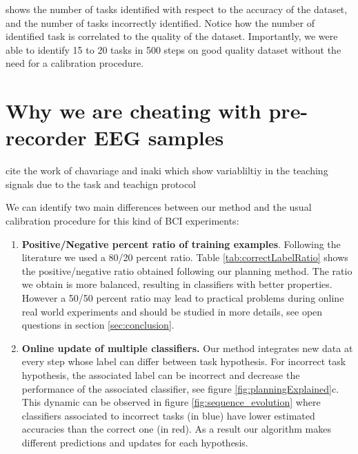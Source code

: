 shows the number of tasks identified with respect to the accuracy of the dataset, and the number of tasks incorrectly identified. Notice how the number of identified task is correlated to the quality of the dataset. Importantly, we were able to identify 15 to 20 tasks in 500 steps on good quality dataset without the need for a calibration procedure.


\section{Why we are cheating with pre-recorder EEG samples}


cite the work of chavariage and inaki which show variabliltiy in the teaching signals due to the task and teachign protocol

We can identify two main differences between our method and the usual calibration procedure for this kind of BCI experiments:
\begin{enumerate}
\item \textbf{Positive/Negative percent ratio of training examples}. Following the literature \cite{chavarriaga2010learning, iturrate2013task} we used a 80/20 percent ratio. Table \ref{tab:correctLabelRatio} shows the positive/negative ratio obtained following our planning method. The ratio we obtain is more balanced, resulting in classifiers with better properties. However a 50/50 percent ratio may lead to practical problems during online real world experiments and should be studied in more details, see open questions in section \ref{sec:conclusion}.
\item \textbf{Online update of multiple classifiers.} Our method integrates new data at every step whose label can differ between task hypothesis. For incorrect task hypothesis, the associated label can be incorrect and decrease the performance of the associated classifier, see figure \ref{fig:planningExplained}c. This dynamic can be observed in figure \ref{fig:sequence_evolution} where classifiers associated to incorrect tasks (in blue) have lower estimated accuracies than the correct one (in red). As a result our algorithm makes different predictions and updates for each hypothesis.
\end{enumerate}


